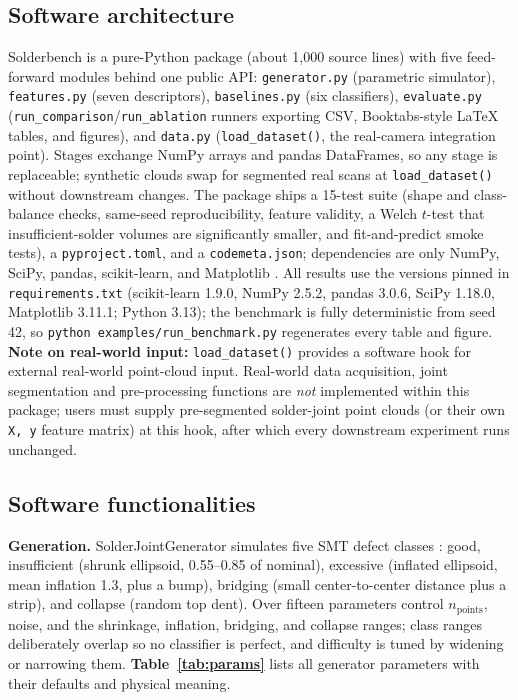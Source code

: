 \documentclass[3p]{elsarticle}
\begin{document}
\subsection{Software architecture}
Solderbench is a pure-Python package (about 1,000 source lines) with five feed-forward modules behind one public API: \texttt{generator.py} (parametric simulator), \texttt{features.py} (seven descriptors), \texttt{baselines.py} (six classifiers), \texttt{evaluate.py} (\texttt{run\_comparison}/\texttt{run\_ablation} runners exporting CSV, Booktabs-style LaTeX tables, and figures), and \texttt{data.py} (\texttt{load\_dataset()}, the real-camera integration point). Stages exchange NumPy arrays and pandas DataFrames, so any stage is replaceable; synthetic clouds swap for segmented real scans at \texttt{load\_dataset()} without downstream changes. The package ships a 15-test suite (shape and class-balance checks, same-seed reproducibility, feature validity, a Welch $t$-test that insufficient-solder volumes are significantly smaller, and fit-and-predict smoke tests), a \texttt{pyproject.toml}, and a \texttt{codemeta.json}; dependencies are only NumPy, SciPy, pandas, scikit-learn, and Matplotlib \cite{ref14,ref15,ref16,ref17}. All results use the versions pinned in \texttt{requirements.txt} (scikit-learn 1.9.0, NumPy 2.5.2, pandas 3.0.6, SciPy 1.18.0, Matplotlib 3.11.1; Python 3.13); the benchmark is fully deterministic from seed 42, so \texttt{python examples/run\_benchmark.py} regenerates every table and figure. \textbf{Note on real-world input:} \texttt{load\_dataset()} provides a software hook for external real-world point-cloud input. Real-world data acquisition, joint segmentation and pre-processing functions are \emph{not} implemented within this package; users must supply pre-segmented solder-joint point clouds (or their own \texttt{X, y} feature matrix) at this hook, after which every downstream experiment runs unchanged.
\subsection{Software functionalities}
\textbf{Generation. }SolderJointGenerator simulates five SMT defect classes \cite{ref6,ref7}: good, insufficient (shrunk ellipsoid, 0.55--0.85 of nominal), excessive (inflated ellipsoid, mean inflation 1.3, plus a bump), bridging (small center-to-center distance plus a strip), and collapse (random top dent). Over fifteen parameters control $n_{\mathrm{points}}$, noise, and the shrinkage, inflation, bridging, and collapse ranges; class ranges deliberately overlap so no classifier is perfect, and difficulty is tuned by widening or narrowing them. \textbf{Table~\ref{tab:params}} lists all generator parameters with their defaults and physical meaning.
\end{document}
